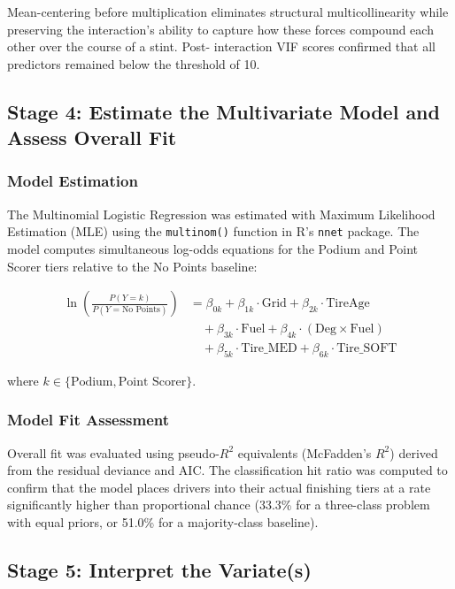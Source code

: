 Mean-centering before multiplication eliminates structural
multicollinearity while preserving the interaction's ability to capture
how these forces compound each other over the course of a stint. Post-
interaction VIF scores confirmed that all predictors remained below the
threshold of 10.

\subsection{Stage 4: Estimate the Multivariate Model and Assess Overall Fit}

\subsubsection{Model Estimation}

The Multinomial Logistic Regression was estimated with Maximum Likelihood
Estimation (MLE) using the \texttt{multinom()} function in R's
\texttt{nnet} package. The model computes simultaneous log-odds equations
for the Podium and Point Scorer tiers relative to the No Points baseline:

\[
\begin{aligned}
  \ln\!\left(\frac{P(Y = k)}{P(Y = \text{No Points})}\right)
  &= \beta_{0k} + \beta_{1k} \cdot \text{Grid} + \beta_{2k} \cdot \text{TireAge} \\
  &\quad + \beta_{3k} \cdot \text{Fuel} + \beta_{4k} \cdot (\text{Deg} \times \text{Fuel}) \\
  &\quad + \beta_{5k} \cdot \text{Tire\_MED} + \beta_{6k} \cdot \text{Tire\_SOFT}
\end{aligned}
\]

where $k \in \{\text{Podium}, \text{Point Scorer}\}$.

\subsubsection{Model Fit Assessment}

Overall fit was evaluated using pseudo-$R^2$ equivalents (McFadden's
$R^2$) derived from the residual deviance and AIC. The classification hit
ratio was computed to confirm that the model places drivers into their
actual finishing tiers at a rate significantly higher than proportional
chance (33.3\% for a three-class problem with equal priors, or 51.0\% for
a majority-class baseline).

\subsection{Stage 5: Interpret the Variate(s)}

